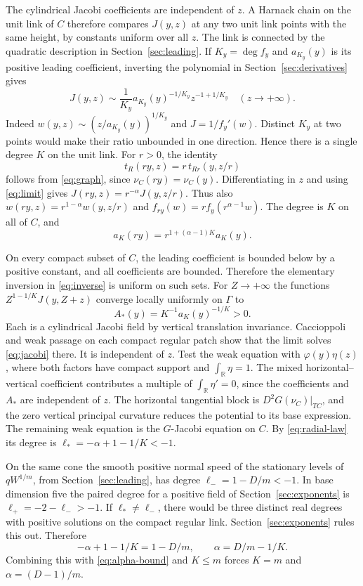 \documentclass[11pt]{amsart}
\begin{document}
The cylindrical Jacobi coefficients are independent of \(z\).
A Harnack chain on the unit link of \(C\) therefore compares
\(J(y,z)\) at any two unit link points with the same height,
by constants uniform over all \(z\). The link is connected
by the quadratic description in Section~\ref{sec:leading}. If \(K_y=\deg f_y\)
and \(a_{K_y}(y)\) is its positive leading coefficient,
inverting the polynomial in Section~\ref{sec:derivatives} gives
\begin{equation}\label{eq:inverse}
 J(y,z)\sim
 \frac{1}{K_y}a_{K_y}(y)^{-1/K_y}z^{-1+1/K_y}
 \quad(z\to+\infty).
\end{equation}
Indeed \(w(y,z)\sim (z/a_{K_y}(y))^{1/K_y}\) and
\(J=1/f_y'(w)\). Distinct \(K_y\) at two points would
make their ratio unbounded in one direction. Hence there
is a single degree \(K\) on the unit link. For \(r>0\),
the identity
\[
 t_R(ry,z)=r\,t_{Rr}(y,z/r)
\]
follows from \eqref{eq:graph}, since \(\nu_C(ry)=\nu_C(y)\).
Differentiating in \(z\) and using \eqref{eq:limit} gives
\(J(ry,z)=r^{-\alpha}J(y,z/r)\). Thus also
\(w(ry,z)=r^{1-\alpha}w(y,z/r)\) and
\(f_{ry}(w)=r f_y(r^{\alpha-1}w)\). The degree is \(K\)
on all of \(C\), and
\begin{equation}\label{eq:radial-law}
 a_K(ry)=r^{1+(\alpha-1)K}a_K(y).
\end{equation}

On every compact subset of \(C\), the leading coefficient
is bounded below by a positive constant, and all coefficients
are bounded. Therefore the elementary inversion in \eqref{eq:inverse} is
uniform on such sets. For \(Z\to+\infty\) the functions
\(Z^{1-1/K}J(y,Z+z)\) converge locally uniformly on
\(\Gamma\) to
\[
 A_*(y)=K^{-1}a_K(y)^{-1/K}>0 .
\]
Each is a cylindrical Jacobi field by vertical translation
invariance. Caccioppoli and weak passage on each compact regular
patch show that the limit solves \eqref{eq:jacobi} there. It is independent
of \(z\). Test the weak equation with \(\varphi(y)\eta(z)\), where
both factors have compact support and \(\int_{\mathbb R}\eta=1\).
The mixed horizontal--vertical coefficient contributes a multiple
of \(\int_{\mathbb R}\eta'=0\), since the coefficients and \(A_*\)
are independent of \(z\). The horizontal tangential block is
\(D^2G(\nu_C)|_{TC}\), and the zero vertical principal curvature
reduces the potential to its base expression. The remaining weak
equation is the \(G\)-Jacobi equation on \(C\). By \eqref{eq:radial-law} its
degree is \(\ell_*=-\alpha+1-1/K<-1\).

On the same cone the smooth positive normal speed of the
stationary levels of \(qW^{1/m}\), from Section~\ref{sec:leading}, has degree
\(\ell_-=1-D/m<-1\). In base dimension five the paired degree for a positive
field of Section~\ref{sec:exponents} is \(\ell_+=-2-\ell_->-1\).
If \(\ell_*\ne\ell_-\), there would be three distinct real
degrees with positive solutions on the compact regular link.
Section~\ref{sec:exponents} rules this out. Therefore
\[
 -\alpha+1-1/K=1-D/m,\qquad
 \alpha=D/m-1/K.
\]
Combining this with \eqref{eq:alpha-bound} and \(K\le m\) forces \(K=m\) and
\(\alpha=(D-1)/m\).
\end{document}
